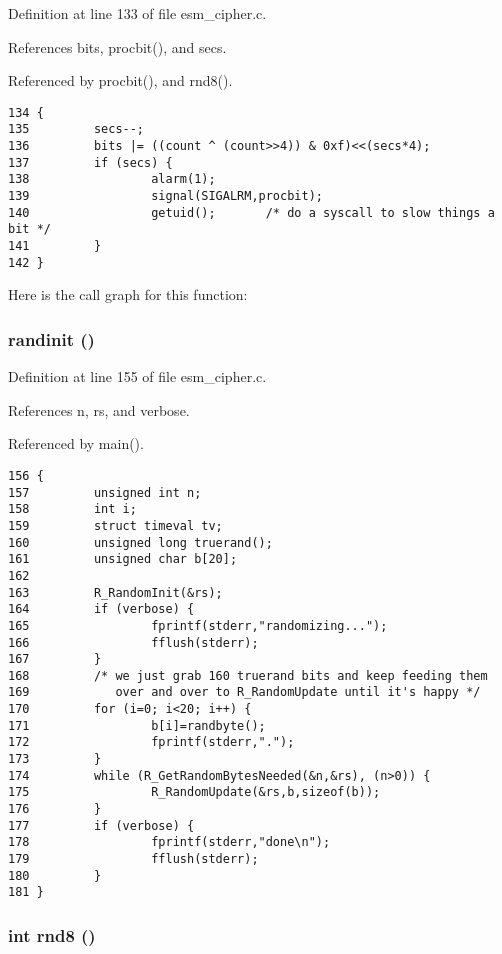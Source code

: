 Definition at line 133 of file esm\_\-cipher.c.

References bits, procbit(), and secs.

Referenced by procbit(), and rnd8().



\footnotesize\begin{verbatim}134 {
135         secs--;
136         bits |= ((count ^ (count>>4)) & 0xf)<<(secs*4);
137         if (secs) {
138                 alarm(1);
139                 signal(SIGALRM,procbit);
140                 getuid();       /* do a syscall to slow things a bit */
141         }
142 }
\end{verbatim}\normalsize 


Here is the call graph for this function:
\subsubsection{\setlength{\rightskip}{0pt plus 5cm}randinit ()}\label{esm__cipher_8c_a34}




Definition at line 155 of file esm\_\-cipher.c.

References n, rs, and verbose.

Referenced by main().



\footnotesize\begin{verbatim}156 {
157         unsigned int n;
158         int i;
159         struct timeval tv;
160         unsigned long truerand();
161         unsigned char b[20];
162         
163         R_RandomInit(&rs);
164         if (verbose) {
165                 fprintf(stderr,"randomizing...");
166                 fflush(stderr);
167         }
168         /* we just grab 160 truerand bits and keep feeding them
169            over and over to R_RandomUpdate until it's happy */
170         for (i=0; i<20; i++) {
171                 b[i]=randbyte();
172                 fprintf(stderr,".");
173         }
174         while (R_GetRandomBytesNeeded(&n,&rs), (n>0)) {
175                 R_RandomUpdate(&rs,b,sizeof(b));
176         }
177         if (verbose) {
178                 fprintf(stderr,"done\n");
179                 fflush(stderr);
180         }
181 }
\end{verbatim}\normalsize 
{}
\subsubsection{\setlength{\rightskip}{0pt plus 5cm}int rnd8 ()}\label{esm__cipher_8c_a35}





